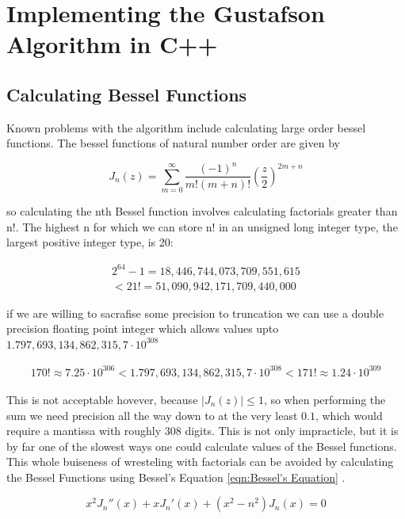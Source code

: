 \documentclass[onecolumn, groupedaddress, 10pt]{revtex4-1}
\begin{document}
\section{Implementing the Gustafson Algorithm in C++}
\subsection{Calculating Bessel Functions}
Known problems with the algorithm include calculating large order bessel functions.  The bessel functions of natural number order are given by

\begin{equation}
J_n(z) = \sum_{m=0}^{\infty} \frac{(-1)^n}{m!(m+n)!} \left( \frac{z}{2} \right)^{2m+n}
\end{equation}

so calculating the nth Bessel function involves calculating factorials greater than n!.  The highest n for which we can store n! in an unsigned long integer type, the largest positive integer type, is 20:

\begin{align}
2^{64}-1 = 18,446,744,073,709,551,615 \\
< 21! = 51,090,942,171,709,440,000
\end{align}

if we are willing to sacrafise some precision to truncation we can use a double precision floating point integer which allows values upto $1.797,693,134,862,315,7 \cdot 10^{308}$

\begin{align}
170! \approx 7.25 \cdot 10^{306}
< 1.797,693,134,862,315,7 \cdot 10^{308} <
171! \approx 1.24 \cdot 10^{309}
\end{align}

This is not acceptable hovever, because $\left| J_n(z) \right| \leq 1$, so when performing the sum we need precision all the way down to at the very least $0.1$, which would require a mantissa with roughly $308$ digits.  This is not only impracticle, but it is by far one of the slowest ways one could calculate values of the Bessel functions.  This whole buiseness of wresteling with factorials can be avoided by calculating the Bessel Functions using Bessel's Equation \ref{eqn:Bessel's Equation} \citep{folland}.

\begin{equation}
\label{eqn:Bessel's Equation}
x^2 J_n''(x) + x J_n'(x) + (x^2 - n^2) J_n(x) = 0
\end{equation}
\end{document}
